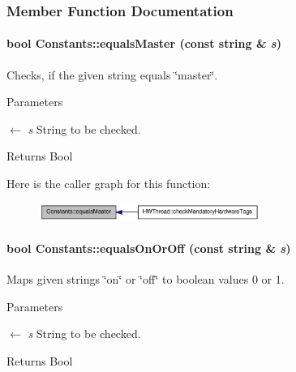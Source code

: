 \subsubsection{Member Function Documentation}
\hypertarget{class_constants_a9a808751c766b2f77cc13362b2064d76}{
\paragraph[{equalsMaster}]{\setlength{\rightskip}{0pt plus 5cm}bool Constants::equalsMaster (const string \& {\em s})}\hfill}
\label{class_constants_a9a808751c766b2f77cc13362b2064d76}


Checks, if the given string equals \char`\"{}master\char`\"{}. 
\begin{DoxyParams}{Parameters}
\item[\mbox{$\leftarrow$} {\em s}]String to be checked. \end{DoxyParams}
\begin{DoxyReturn}{Returns}
Bool 
\end{DoxyReturn}


Here is the caller graph for this function:\nopagebreak
\begin{figure}[H]
\begin{center}
\leavevmode
\includegraphics[width=204pt]{class_constants_a9a808751c766b2f77cc13362b2064d76_icgraph}
\end{center}
\end{figure}
\hypertarget{class_constants_aacd7600c3d6c2dcdd3b6d2740de1c7bd}{
\paragraph[{equalsOnOrOff}]{\setlength{\rightskip}{0pt plus 5cm}bool Constants::equalsOnOrOff (const string \& {\em s})}\hfill}
\label{class_constants_aacd7600c3d6c2dcdd3b6d2740de1c7bd}


Maps given strings \char`\"{}on\char`\"{} or \char`\"{}off\char`\"{} to boolean values 0 or 1. 
\begin{DoxyParams}{Parameters}
\item[\mbox{$\leftarrow$} {\em s}]String to be checked. \end{DoxyParams}
\begin{DoxyReturn}{Returns}
Bool 
\end{DoxyReturn}

